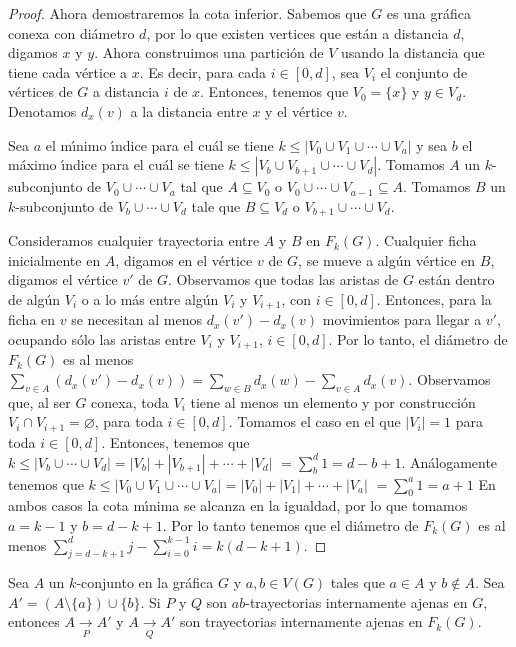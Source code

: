 \begin{proof}
Ahora demostraremos la cota inferior. Sabemos que $G$ es una gr\'afica conexa
con di\'ametro $d$, por lo que existen vertices que est\'an a distancia
$d$, digamos $x$ y $y$. Ahora construimos una partici\'on de $V$ usando  la
distancia que tiene cada v\'ertice a $x$. Es decir, para cada $i\in [0,d]$,
sea $V_{i}$ el conjunto de v\'ertices de $G$ a distancia $i$ de $x$. Entonces,
tenemos que $V_{0}=\{x\}$ y $y\in V_{d}$. Denotamos $d_x(v)$ a la distancia
entre $x$ y el v\'ertice $v$.

Sea $a$ el m\'\i{}nimo \'\i{}ndice para el cu\'al se tiene $k \leq |V_{0}\cup
V_{1}\cup \cdots \cup V_{a}|$ y sea $b$ el m\'aximo \'\i{}ndice para el cu\'al se
tiene $k\leq |V_{b}\cup V_{b+1}\cup \cdots \cup V_{d}|$. Tomamos $A$ un
$k$-subconjunto de $V_{0}\cup \cdots \cup V_{a}$  tal que $A\subseteq
V_{0}$ o $V_{0}\cup \cdots \cup V_{a-1}\subseteq A$. Tomamos $B$ un
$k$-subconjunto de $V_{b}\cup \cdots \cup V_{d}$ tale que
$B\subseteq V_{d}$ o $V_{b+1}\cup \cdots \cup V_{d}$. 

Consideramos cualquier trayectoria entre $A$ y $B$ en $F_{k}(G)$. Cualquier
ficha inicialmente en $A$, digamos en el v\'ertice $v$ de $G$, se mueve a
alg\'un v\'ertice en $B$, digamos el v\'ertice $v'$ de $G$. Observamos que todas
las aristas de $G$ est\'an dentro de alg\'un $V_{i}$ o a lo m\'as entre alg\'un
$V_{i}$ y $V_{i+1}$, con $i\in[0,d]$. Entonces, para la ficha en $v$ se
necesitan al menos $d_x(v')-d_x(v)$ movimientos para llegar a $v'$, ocupando
s\'olo las aristas entre $V_{i}$ y $V_{i+1}$, $i\in [0,d]$. Por lo tanto,
el di\'ametro de $F_{k}(G)$ es al menos $\sum_{v\in A}(d_x(v')-d_x(v))=
\sum_{w\in B}d_x(w)-\sum_{v\in A}d_x(v)$. Observamos que, al ser $G$ conexa,
toda $V_{i}$ tiene al menos un elemento y por construcci\'on $V_{i} \cap
V_{i+1}=\varnothing$, para toda $i\in [0,d]$. Tomamos el caso en el que
$|V_{i}|=1$ para toda $i\in [0,d]$. Entonces, tenemos que $k\leq
|V_{b}\cup\cdots\cup V_{d}|=|V_{b}|+|V_{b+1}|+\cdots +|V_d|$
$=\sum_{b}^{d}1 = d -b+1$. An\'alogamente tenemos que $k\leq
|V_{0}\cup V_{1}\cup \cdots \cup V_{a}|=|V_{0}|+|V_{1}|+\cdots + |V_{a}|$
$=\sum_{0}^{a} 1 = a+1$ En ambos casos la cota m\'\i{}nima se alcanza en la
igualdad, por lo que tomamos $a=k-1$ y $b=d-k+1$. Por lo tanto tenemos que
el di\'ametro de $F_{k}(G)$ es al menos $\sum_{j=d -k+1}^{d}j -
\sum_{i=0}^{k-1}i = k(d-k+1)$.
\end{proof}


\begin{lema}%
\label{lem:TrayIntAj-G-FG}
Sea $A$ un $k$-conjunto en la gr\'afica $G$ y $a, b \in V(G)$ tales que $a \in
A$ y $b \notin A$. Sea $A' = (A \setminus \{ a \}) \cup \{ b \}$. Si $P$ y $Q$
son $ab$-trayectorias internamente ajenas en $G$, entonces $A \xrightarrow[P]{}
A'$ y $A \xrightarrow[Q]{} A'$ son trayectorias internamente ajenas en
$F_{k}(G)$.
\end{lema}

